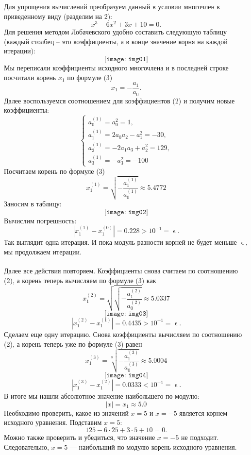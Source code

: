 \documentclass[a4paper, 12pt]{article}
\renewcommand{\epsilon}{\upvarepsilon}
\begin{document}
\begin{enumerate}
		 Для упрощения вычислений преобразуем данный в условии многочлен к приведенному виду (разделим на 2):
		 $$x^3-6x^2+3x +10 = 0.$$
		 Для решения методом Лобачевского удобно составить следующую таблицу (каждый столбец -- это коэффициенты, а в конце значение корня на каждой итерации):
		 $$
		 \texttt{[image: img01]}
		 $$
		 Мы переписали коэффициенты исходного многочлена и в последней строке посчитали корень $x_1$ по формуле (3) $$x_1 = - \dfrac{a_1}{a_0}.$$
		 Далее воспользуемся соотношением для коэффициентов (2) и получим новые коэффициенты:
		 $$\begin{cases}
		 	a_0^{(1)} = a_0^2 = 1,\\
		 	a_1^{(1)} =2a_0a_2 - a_1^2 = -30,\\
		 	a_2^{(1)} = - 2a_1a_3 + a_2^2 = 129,\\
		 	a_3^{(1)} = -a_3^2 = -100
		 \end{cases}$$
		 Посчитаем корень по формуле (3) $$x_1^{(1)} = \sqrt{- \dfrac{a_1^{(1)}}{a_0^{(1)}}} \approx 5.4772$$
		 Заносим в таблицу:
		 $$
		 \texttt{[image: img02]}
		 $$
		 Вычислим погрешность: $$|x_1^{(1)} - x_1^{(0)}| = 0.228 > 10^{-1} = \epsilon.$$
		 Так выглядит одна итерация. И пока модуль разности корней не будет меньше $\epsilon$, мы продолжаем итерации.\\\\
		 Далее все действия повторяем. Коэффициенты снова считаем по соотношению (2), а корень теперь вычисляем по формуле (3) как $$x_1^{(2)} = \sqrt{\sqrt{- \dfrac{a_1^{(2)}}{a_0^{(2)}}}}\approx 5.0337$$
		 $$
		 \texttt{[image: img03]}
		 $$
		 $$|x_1^{(2)} - x_1^{(1)}| = 0.4435 > 10^{-1} = \epsilon.$$
		 Сделаем еще одну итерацию. Снова коэффициенты вычисляем по соотношению (2), а корень теперь уже по формуле (3) равен $$x_1^{(3)} = \sqrt[8]{- \dfrac{a_1^{(3)}}{a_0^{(3)}}}\approx 5.0004$$
		 $$
		 \texttt{[image: img04]}
		 $$
		 $$|x_1^{(3)} - x_1^{(2)}| = 0.0333 < 10^{-1} = \epsilon.$$
		 В итоге мы нашли абсолютное значение наибольшего по модулю: $$|x| = x_1 \approx 5.0$$
		 Необходимо проверить, какое из значений $x=5$ и $x=-5$ является корнем исходного уравнения. Подставим $x=5$:
		 $$125 - 6\cdot 25 + 3\cdot 5 + 10 = 0.$$
		 Можно также проверить и убедиться, что значение $x=-5$ не подходит. Следовательно, $x=5$ --- наибольший по модулю корень исходного уравнения.
		 

\end{enumerate}
\end{document}

